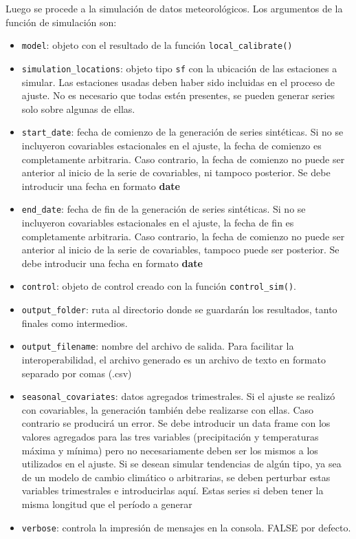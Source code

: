 \documentclass[
  12pt]{article}
\providecommand{\tightlist}{%
  \setlength{\itemsep}{0pt}\setlength{\parskip}{0pt}}
\begin{document}
Luego se procede a la simulación de datos meteorológicos. Los argumentos de la función de simulación son:

\begin{itemize}
\tightlist
\item
  \texttt{model}: objeto con el resultado de la función \texttt{local\_calibrate()}
\item
  \texttt{simulation\_locations}: objeto tipo \texttt{sf} con la ubicación de las estaciones a simular. Las estaciones usadas deben haber sido incluidas en el proceso de ajuste. No es necesario que todas estén presentes, se pueden generar series solo sobre algunas de ellas.
\item
  \texttt{start\_date}: fecha de comienzo de la generación de series sintéticas. Si no se incluyeron covariables estacionales en el ajuste, la fecha de comienzo es completamente arbitraria. Caso contrario, la fecha de comienzo no puede ser anterior al inicio de la serie de covariables, ni tampoco posterior. Se debe introducir una fecha en formato \textbf{date}
\item
  \texttt{end\_date}: fecha de fin de la generación de series sintéticas. Si no se incluyeron covariables estacionales en el ajuste, la fecha de fin es completamente arbitraria. Caso contrario, la fecha de comienzo no puede ser anterior al inicio de la serie de covariables, tampoco puede ser posterior. Se debe introducir una fecha en formato \textbf{date}
\item
  \texttt{control}: objeto de control creado con la función \texttt{control\_sim()}.
\item
  \texttt{output\_folder}: ruta al directorio donde se guardarán los resultados, tanto finales como intermedios.
\item
  \texttt{output\_filename}: nombre del archivo de salida. Para facilitar la interoperabilidad, el archivo generado es un archivo de texto en formato separado por comas (.csv)
\item
  \texttt{seasonal\_covariates}: datos agregados trimestrales. Si el ajuste se realizó con covariables, la generación también debe realizarse con ellas. Caso contrario se producirá un error. Se debe introducir un data frame con los valores agregados para las tres variables (precipitación y temperaturas máxima y mínima) pero no necesariamente deben ser los mismos a los utilizados en el ajuste. Si se desean simular tendencias de algún tipo, ya sea de un modelo de cambio climático o arbitrarias, se deben perturbar estas variables trimestrales e introducirlas aquí. Estas series si deben tener la misma longitud que el período a generar
\item
  \texttt{verbose}: controla la impresión de mensajes en la consola. FALSE por defecto.
\end{itemize}
\end{document}
